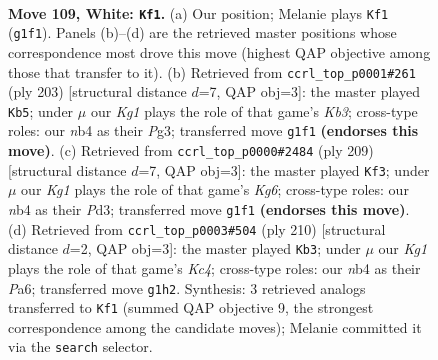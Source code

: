 \documentclass[11pt]{article}
\begin{document}
\clearpage

\begin{figure}[p]\centering
\begin{subfigure}{0.46\textwidth}\centering
\resizebox{\linewidth}{!}{%
\newchessgame
\chessboard[
  setfen={8/8/8/8/1n1B3k/5b2/5P2/6K1 w - - 63 109},
  showmover=false,
  pgfstyle=straightmove, color=movearrow, markmove={g1-f1}
]}
\caption{}
\end{subfigure}\hfill
\begin{subfigure}{0.46\textwidth}\centering
\resizebox{\linewidth}{!}{%
\newchessgame
\chessboard[
  setfen={8/8/1k1b4/2p5/8/1K4p1/6B1/8 b - - 75 102},
  showmover=false,
  pgfstyle=straightmove, color=movearrow, markmove={b6-b5}
]}
\caption{}
\end{subfigure}
\\[4pt]
\begin{subfigure}{0.46\textwidth}\centering
\resizebox{\linewidth}{!}{%
\newchessgame
\chessboard[
  setfen={8/8/8/8/4b3/3p2k1/6p1/3K2B1 b - - 17 105},
  showmover=false,
  pgfstyle=straightmove, color=movearrow, markmove={g3-f3}
]}
\caption{}
\end{subfigure}\hfill
\begin{subfigure}{0.46\textwidth}\centering
\resizebox{\linewidth}{!}{%
\newchessgame
\chessboard[
  setfen={8/b3k3/P7/3P4/2K5/5B2/8/8 w - - 23 106},
  showmover=false,
  pgfstyle=straightmove, color=movearrow, markmove={c4-b3}
]}
\caption{}
\end{subfigure}
\caption{\textbf{Move 109, White: \texttt{Kf1}.} (a) Our position; Melanie plays \texttt{Kf1} (\texttt{g1f1}). Panels (b)--(d) are the retrieved master positions whose correspondence most drove this move (highest QAP objective among those that transfer to it). (b) Retrieved from \texttt{ccrl\_top\_p0001\#261} (ply 203) [structural distance $d$=7, QAP obj=3]: the master played \texttt{Kb5}; under $\mu$ our \emph{Kg1} plays the role of that game's \emph{Kb3}; cross-type roles: our \emph{n}b4 as their \emph{P}g3; transferred move \texttt{g1f1} \textbf{(endorses this move)}. (c) Retrieved from \texttt{ccrl\_top\_p0000\#2484} (ply 209) [structural distance $d$=7, QAP obj=3]: the master played \texttt{Kf3}; under $\mu$ our \emph{Kg1} plays the role of that game's \emph{Kg6}; cross-type roles: our \emph{n}b4 as their \emph{P}d3; transferred move \texttt{g1f1} \textbf{(endorses this move)}. (d) Retrieved from \texttt{ccrl\_top\_p0003\#504} (ply 210) [structural distance $d$=2, QAP obj=3]: the master played \texttt{Kb3}; under $\mu$ our \emph{Kg1} plays the role of that game's \emph{Kc4}; cross-type roles: our \emph{n}b4 as their \emph{P}a6; transferred move \texttt{g1h2}. Synthesis: 3 retrieved analogs transferred to \texttt{Kf1} (summed QAP objective 9, the strongest correspondence among the candidate moves); Melanie committed it via the \texttt{search} selector.}
\label{fig:thought-m216}
\end{figure}
\end{document}
